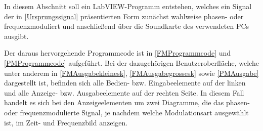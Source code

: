 \documentclass[
a4paper,
12pt,
pagesize,
ngerman
]{scrartcl}
\begin{document}
	In diesem Abschnitt soll ein LabVIEW-Programm entstehen, welches ein Signal der in \cref{Ursprungssignal} präsentierten Form zunächst wahlweise phasen- oder frequenzmoduliert und anschließend über die Soundkarte des verwendeten PCs ausgibt. 
	
	Der daraus hervorgehende Programmcode ist in \cref{FMProgrammcode} und \cref{PMProgrammcode} aufgeführt. 
	Bei der dazugehörigen Benutzeroberfläche, welche unter anderem in \cref{FMAusgabekleinesk}, \cref{FMAusgabegrossesk} sowie \cref{PMAusgabe} dargestellt ist, befinden sich alle Bedien- bzw. Eingabeelemente auf der linken und alle Anzeige- bzw. Ausgabeelemente auf der rechten Seite. %
	In diesem Fall handelt es sich bei den Anzeigeelementen um zwei Diagramme, die das phasen- oder frequenzmodulierte Signal, je nachdem welche Modulationsart ausgewählt ist, im Zeit- und Frequenzbild anzeigen. 
\end{document}
